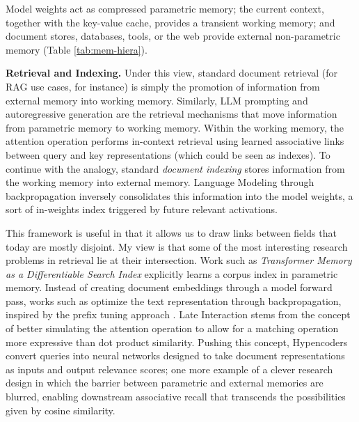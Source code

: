 Model weights act as compressed parametric memory; the current context, together with the key-value cache, provides a transient working memory; and document stores, databases, tools, or the web provide external non-parametric memory (Table \ref{tab:mem-hiera}). 

\noindent\textbf{Retrieval and Indexing.} Under this view, standard document retrieval (for RAG use cases, for instance) is simply the promotion of information from external memory into working memory. Similarly, LLM prompting and autoregressive generation are the retrieval mechanisms that move information from parametric memory to working memory. Within the working memory, the attention operation performs in-context retrieval using learned associative links between query and key representations (which could be seen as indexes). To continue with the analogy, standard \emph{document indexing} stores information from the working memory into external memory. Language Modeling through backpropagation inversely consolidates this information into the model weights, a sort of in-weights index triggered by future relevant activations.

This framework is useful in that it allows us to draw links between fields that today are mostly disjoint. My view is that some of the most interesting research problems in retrieval lie at their intersection. Work such as \emph{Transformer Memory as a Differentiable Search Index}  explicitly learns a corpus index in parametric memory. Instead of creating document embeddings through a model forward pass, works such as  optimize the text representation through backpropagation, inspired by the prefix tuning approach .  Late Interaction  stems from the concept of better simulating the attention operation to allow for a matching operation more expressive than dot product similarity. Pushing this concept, Hypencoders  convert queries into neural networks designed to take document representations as inputs and output relevance scores; one more example of a clever research design in which the barrier between parametric and external memories are blurred, enabling downstream associative recall that transcends the possibilities given by cosine similarity.

